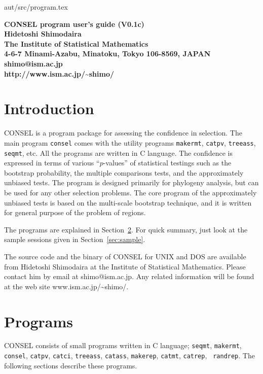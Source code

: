 \documentclass[12pt]{article}
\newcommand{\refsec}[1]{Section~\ref{sec:#1}}
\begin{document}
{aut/src/program.tex\hfill \documentid}
\begin{center}
 \bf\large CONSEL program user's guide (V0.1c)\\[3ex]
 Hidetoshi Shimodaira\\[2ex]
 \normalsize
 The Institute of Statistical Mathematics\\
 4-6-7 Minami-Azabu, Minatoku, Tokyo 106-8569, JAPAN\\
 shimo@ism.ac.jp\\
 http://www.ism.ac.jp/\~{}shimo/
\end{center}

\section{Introduction}

CONSEL is a program package for assessing the confidence in
selection. The main program {\tt consel} comes with the utility programs
{\tt makermt}, {\tt catpv}, {\tt treeass}, {\tt seqmt}, etc. All the
programs are written in C language. The confidence is expressed in terms
of various ``$p$-values'' of statistical testings such as the bootstrap
probability, the multiple comparisons tests, and the approximately
unbiased tests. The program is designed primarily for phylogeny
analysis, but can be used for any other selection problems. The core
program of the approximately unbiased tests is based on the multi-scale
bootstrap technique, and it is written for general purpose of the
problem of regions.

The programs are explained in \refsec{usage}.  For quick summary, just
look at the sample sessions given in \refsec{sample}.

The source code and the binary of CONSEL for UNIX and DOS are available
from Hidetoshi Shimodaira at the Institute of Statistical
Mathematics. Please contact him by email at shimo@ism.ac.jp. Any related
information will be found at the web site www.ism.ac.jp/\~{}shimo/.



\section{Programs} \label{sec:usage}

CONSEL consists of small programs written in C language; {\tt seqmt},
{\tt makermt}, {\tt consel}, {\tt catpv}, {\tt catci}, {\tt treeass},
{\tt catass}, {\tt makerep}, {\tt catmt}, {\tt catrep}, {\tt
randrep}. The following sections describe these programs.
\end{document}

